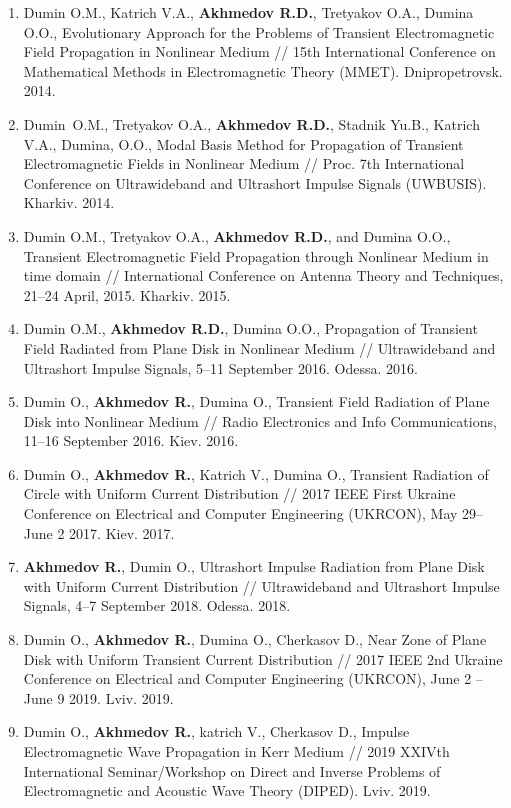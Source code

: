 \begin{enumerate}
\setcounter{enumi}{\value{ItemsInMyWriting}}

\item Dumin O.M., Katrich V.A., \textbf{Akhmedov R.D.}, Tretyakov O.A., 
Dumina O.O., Evolutionary Approach for the Problems of Transient 
Electromagnetic Field Propagation in Nonlinear Medium // 15th International 
Conference on Mathematical Methods in Electromagnetic Theory (MMET).
Dnipropetrovsk. 2014.

\item Dumin O.M., Tretyakov O.A., \textbf{Akhmedov R.D.}, Stadnik Yu.B., 
Katrich V.A., Dumina, O.O., Modal Basis Method for Propagation of 
Transient Electromagnetic Fields in Nonlinear Medium // Proc. 7th 
International Conference on Ultrawideband and Ultrashort Impulse Signals 
(UWBUSIS). Kharkiv. 2014.

\item Dumin O.M., Tretyakov O.A., \textbf{Akhmedov R.D.}, and Dumina O.O., 
Transient Electromagnetic Field Propagation through Nonlinear Medium in 
time domain // International Conference on Antenna Theory and Techniques, 
21--24 April, 2015. Kharkiv. 2015.

\item Dumin O.M., \textbf{Akhmedov R.D.}, Dumina O.O., Propagation of 
Transient Field Radiated from Plane Disk in Nonlinear Medium // 
Ultrawideband and Ultrashort Impulse Signals, 5--11 September 2016. 
Odessa. 2016.

\item Dumin O., \textbf{Akhmedov R.}, Dumina O., Transient Field 
Radiation of Plane Disk into Nonlinear Medium // Radio Electronics and 
Info Communications, 11--16 September 2016. Kiev. 2016.

\item Dumin O., \textbf{Akhmedov R.}, Katrich V., Dumina O., Transient 
Radiation of Circle with Uniform Current Distribution // 2017 IEEE First 
Ukraine Conference on Electrical and Computer Engineering (UKRCON), 
May 29--June 2 2017. Kiev. 2017.

\item \textbf{Akhmedov R.}, Dumin O., Ultrashort Impulse Radiation from 
Plane Disk with Uniform Current Distribution // Ultrawideband and 
Ultrashort Impulse Signals, 4--7 September 2018. Odessa. 2018.

\item Dumin O., \textbf{Akhmedov R.}, Dumina O., Cherkasov D., Near Zone 
of Plane Disk with Uniform Transient Current Distribution // 2017 IEEE 2nd 
Ukraine Conference on Electrical and Computer Engineering (UKRCON), 
June 2 -- June 9 2019. Lviv. 2019.

\item Dumin O., \textbf{Akhmedov R.}, katrich V., Cherkasov D., 
Impulse Electromagnetic Wave Propagation in Kerr Medium // 2019 XXIVth 
International Seminar/Workshop on Direct and Inverse Problems of 
Electromagnetic and Acoustic Wave Theory (DIPED). Lviv. 2019.

\setcounter{ItemsInMyWriting}{\value{enumi}}
\end{enumerate}



